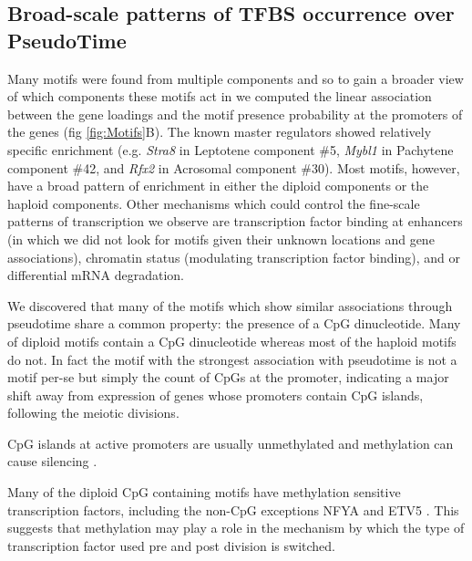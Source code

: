 \subsection{Broad-scale patterns of TFBS occurrence over PseudoTime}
Many motifs were found from multiple components and so to gain a broader view of which components these motifs act in we computed the linear association between the gene loadings and the motif presence probability at the promoters of the genes (fig \ref{fig:Motifs}B). The known master regulators showed relatively specific enrichment (e.g. \textit{Stra8} in Leptotene component \#5, \textit{Mybl1} in Pachytene component \#42, and \textit{Rfx2} in Acrosomal component \#30). Most motifs, however, have a broad pattern of enrichment in either the diploid components or the haploid components. Other mechanisms which could control the fine-scale patterns of transcription we observe are transcription factor binding at enhancers (in which we did not look for motifs given their unknown locations and gene associations), chromatin status (modulating transcription factor binding), and or differential mRNA degradation.

We discovered that many of the motifs which show similar associations through pseudotime share a common property: the presence of a CpG dinucleotide. Many of diploid motifs contain a CpG dinucleotide whereas most of the haploid motifs do not. In fact the motif with the strongest association with pseudotime is not a motif per-se but simply the count of CpGs at the promoter, indicating a major shift away from expression of genes whose promoters contain CpG islands, following the meiotic divisions.

CpG islands at active promoters are usually unmethylated and methylation can cause silencing \parencite{Li2014DNA}. 

Many of the diploid CpG containing motifs have methylation sensitive transcription factors, including the non-CpG exceptions NFYA and ETV5 \parencite{Domcke2015Competition, Wang2017NRF1}. This suggests that methylation may play a role in the mechanism by which the type of transcription factor used pre and post division is switched.

